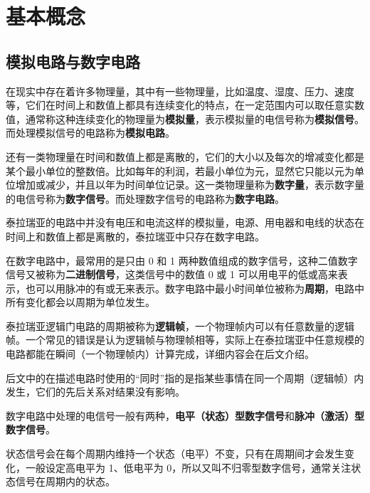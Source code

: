 \chapter{基本概念}

\section{模拟电路与数字电路}

在现实中存在着许多物理量，其中有一些物理量，比如温度、湿度、压力、速度等，它们在时间上和数值上都具有连续变化的特点，在一定范围内可以取任意实数值，通常称这种连续变化的物理量为\textbf{模拟量}，表示模拟量的电信号称为\textbf{模拟信号}。而处理模拟信号的电路称为\textbf{模拟电路}。

还有一类物理量在时间和数值上都是离散的，它们的大小以及每次的增减变化都是某个最小单位的整数倍。比如每年的利润，若最小单位为元，显然它只能以元为单位增加或减少，并且以年为时间单位记录。这一类物理量称为\textbf{数字量}，表示数字量的电信号称为\textbf{数字信号}。而处理数字信号的电路称为\textbf{数字电路}。

\begin{note}{}{}
  泰拉瑞亚的电路中并没有电压和电流这样的模拟量，电源、用电器和电线的状态在时间上和数值上都是离散的，泰拉瑞亚中只存在数字电路。
\end{note}

在数字电路中，最常用的是只由 0 和 1 两种数值组成的数字信号，这种二值数字信号又被称为\textbf{二进制信号}，这类信号中的数值 0 或 1 可以用电平的低或高来表示，也可以用脉冲的有或无来表示。数字电路中最小时间单位被称为\textbf{周期}，电路中所有变化都会以周期为单位发生。

\begin{note}{}{}
  泰拉瑞亚逻辑门电路的周期被称为\textbf{逻辑帧}，一个物理帧内可以有任意数量的逻辑帧。一个常见的错误是认为逻辑帧与物理帧相等，实际上在泰拉瑞亚中任意规模的电路都能在瞬间（一个物理帧内）计算完成，详细内容会在后文介绍。
\end{note}

\begin{remark}{}{}
  后文中的在描述电路时使用的“同时”指的是指某些事情在同一个周期（逻辑帧）内发生，它们的先后关系对结果没有影响。
\end{remark}

数字电路中处理的电信号一般有两种，\textbf{电平（状态）型数字信号}和\textbf{脉冲（激活）型数字信号}。

状态信号会在每个周期内维持一个状态（电平）不变，只有在周期间才会发生变化，一般设定高电平为 1、低电平为 0，所以又叫不归零型数字信号，通常关注状态信号在周期内的状态。

